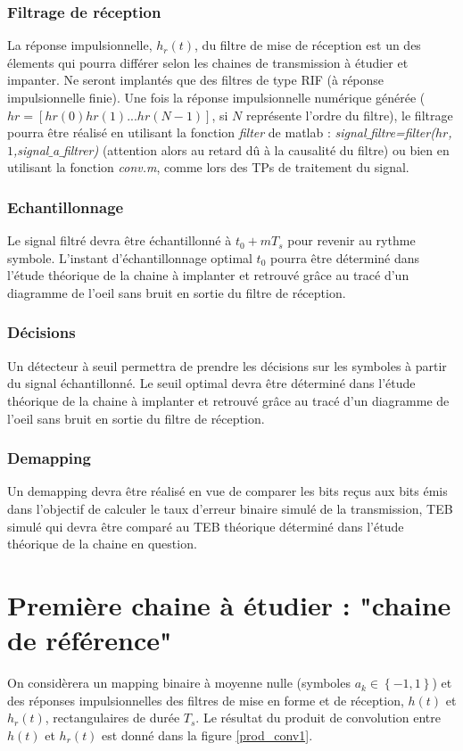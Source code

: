 \documentclass{article}
\begin{document}
\subsubsection{Filtrage de réception}
La réponse impulsionnelle, $h_r(t)$, du filtre de mise de réception est un des élements qui pourra différer selon les chaines de transmission à étudier et impanter. Ne seront implantés que des filtres de type RIF (à réponse impulsionnelle finie). Une fois la réponse impulsionnelle numérique générée ($hr=\left[hr(0) hr(1) ... hr(N-1)\right]$, si $N$ représente l'ordre du filtre), le filtrage pourra être réalisé en utilisant la fonction \emph{filter} de matlab : \emph{signal$\_$filtre=filter($hr$,$1$,signal$\_$a$\_$filtrer)} (attention alors au retard dû à la causalité du filtre) ou bien en utilisant la fonction \emph{conv.m}, comme lors des TPs de traitement du signal.

\subsubsection{Echantillonnage}
Le signal filtré devra être échantillonné à $t_0+mT_s$ pour revenir au rythme symbole. L'instant d'échantillonnage optimal $t_0$ pourra être déterminé dans l'étude théorique de la chaine à implanter et retrouvé grâce au tracé d'un diagramme de l'oeil sans bruit en sortie du filtre de réception.

\subsubsection{Décisions}
Un détecteur à seuil permettra de prendre les décisions sur les symboles à partir du signal échantillonné. Le seuil optimal devra être déterminé dans l'étude théorique de la chaine à implanter et retrouvé grâce au tracé d'un diagramme de l'oeil sans bruit en sortie du filtre de réception.

\subsubsection{Demapping} Un demapping devra être réalisé en vue de comparer les bits reçus aux bits émis dans l'objectif de calculer le taux d'erreur binaire simulé de la transmission, TEB simulé qui devra être comparé au TEB théorique déterminé dans l'étude théorique de la chaine en question.\\


\section{Première chaine à étudier : "chaine de référence"}
On considèrera un mapping binaire à moyenne nulle (symboles $a_k \in \left\{-1,1\right\}$) et des réponses impulsionnelles des filtres de mise en forme et de réception, $h(t)$ et $h_r(t)$, rectangulaires de durée $T_s$. Le résultat du produit de convolution entre $h(t)$ et $h_r(t)$ est donné dans la figure \ref{prod_conv1}.
\end{document}
